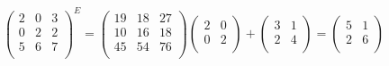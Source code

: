 \[
\begin{pmatrix}
2 & 0 & 3\\
0 & 2 & 2\\
5 & 6 & 7\\
\end{pmatrix}
^{E}=
\begin{pmatrix}
19 & 18 & 27\\
10 & 16 & 18\\
45 & 54 & 76\\
\end{pmatrix}
\begin{pmatrix}
2 & 0\\
0 & 2\\
\end{pmatrix}
+
\begin{pmatrix}
3 & 1\\
2 & 4\\
\end{pmatrix}
=
\begin{pmatrix}
5 & 1\\
2 & 6\\
\end{pmatrix}
\]